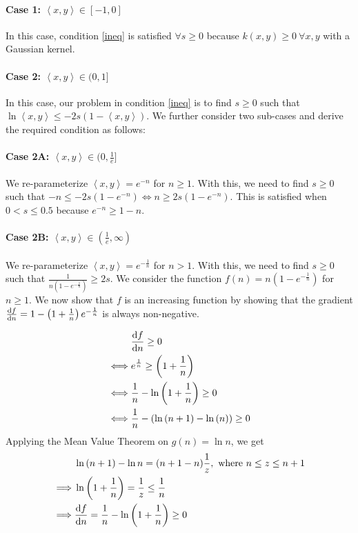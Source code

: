 \paragraph{Case 1: $\left<x, y\right>\in [-1, 0]$} In this case, condition \ref{ineq} is satisfied $\forall s\geq 0$ because $k(x, y)\geq 0 ~ \forall x, y$ with a Gaussian kernel.

\paragraph{Case 2: $\left<x, y\right>\in (0, 1]$} In this case, our problem in condition \ref{ineq} is to find $s\geq 0$ such that $\ln{\left<x, y\right>} \leq -2s(1-\left<x, y\right>)$. We further consider two sub-cases and derive the required condition as follows:
\paragraph{Case 2A: $\left<x, y\right>\in (0, \frac{1}{e}\big]$} We re-parameterize $\left<x, y\right> = e^{-n}$ for $n\geq 1$. With this, we need to find $s\geq 0$ such that $-n \leq -2s(1-e^{-n}) \iff n \geq 2s(1-e^{-n})$. This is satisfied when $0<s\leq 0.5$ because $e^{-n}\geq 1-n$.
\paragraph{Case 2B: $\left<x, y\right>\in (\frac{1}{e}, \infty)$} We re-parameterize $\left<x, y\right> = e^{-\frac{1}{n}}$ for $n> 1$. With this, we need to find $s\geq 0$ such that $\frac{1}{n\left(1-e^{-\frac{1}{n}}\right)} \geq 2s$. We consider the function $f(n)= n\left(1-e^{-\frac{1}{n}}\right)$ for $n\geq 1$. We now show that $f$ is an increasing function by showing that the gradient $\frac{\textup{d}f}{\textup{d}n} = 1-\left(1+\frac{1}{n} \right)e^{-\frac{1}{n}}$ is always non-negative.

\begin{equation*}
    \begin{split}
    &\frac{\textup{d}f}{\textup{d}n} \geq 0
    \\\iff & e^{\frac{1}{n}}  \geq \left( 1+ \frac{1}{n}\right)\\
    \iff & \frac{1}{n} - \ln{\left(1+ \frac{1}{n} \right)} \geq 0\\
    \iff & \frac{1}{n} - \left(\ln{(n+1)}-\ln{(n)}\right) \geq 0
    \end{split}
\end{equation*}
Applying the Mean Value Theorem on $g(n) = \ln{n}$, we get 
\begin{equation*}
    \begin{split}
        &\ln{(n+1)} - \ln{n} = (n+1-n)\frac{1}{z}, ~ \textup{where }n\leq z \leq n+1\\
        \implies & \ln{\left(1+ \frac{1}{n} \right)} = \frac{1}{z}\leq \frac{1}{n}\\
        \implies & \frac{\textup{d}f}{\textup{d}n} = \frac{1}{n} - \ln{\left(1+ \frac{1}{n} \right)} \geq 0
    \end{split}
\end{equation*}

